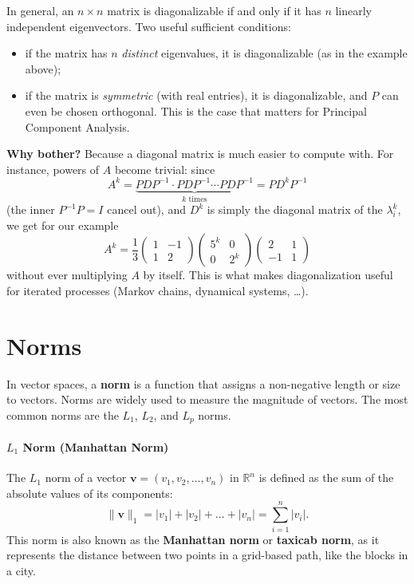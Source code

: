\documentclass[]{article}
\begin{document}
	In general, an $n \times n$ matrix is diagonalizable if and only if it has $n$ linearly independent eigenvectors.
	Two useful sufficient conditions:
	\begin{itemize}
		\item if the matrix has $n$ \textit{distinct} eigenvalues, it is diagonalizable (as in the example above);
		\item if the matrix is \textit{symmetric} (with real entries), it is diagonalizable, and $P$ can even be chosen orthogonal. This is the case that matters for Principal Component Analysis.
	\end{itemize}

	\noindent \textbf{Why bother?}
	Because a diagonal matrix is much easier to compute with.
	For instance, powers of $A$ become trivial: since
	$$
	A^k = \underbrace{PDP^{-1} \cdot PDP^{-1} \cdots PDP^{-1}}_{k \text{ times}} = P D^k P^{-1}
	$$
	(the inner $P^{-1}P = I$ cancel out), and $D^k$ is simply the diagonal matrix of the $\lambda_i^k$, we get for our example
	$$
	A^{k} = \frac{1}{3}\begin{pmatrix} 1 & -1 \\ 1 & 2 \end{pmatrix}\begin{pmatrix} 5^{k} & 0 \\ 0 & 2^{k} \end{pmatrix}\begin{pmatrix} 2 & 1 \\ -1 & 1 \end{pmatrix}
	$$
	without ever multiplying $A$ by itself.
	This is what makes diagonalization useful for iterated processes (Markov chains, dynamical systems, \dots).
	
	
	\section{Norms}
	In vector spaces, a \textbf{norm} is a function that assigns a non-negative length or size to vectors.
	Norms are widely used to measure the magnitude of vectors.
	The most common norms are the $L_1$, $L_2$, and $L_p$ norms.
	
	\paragraph{$L_1$ Norm (Manhattan Norm)}
	The $L_1$ norm of a vector $\mathbf{v} = (v_1, v_2, \dots, v_n)$ in $\mathbb{R}^n$ is defined as the sum of the absolute values of its components:
	$$
	\|\mathbf{v}\|_1 = |v_1| + |v_2| + \dots + |v_n| = \sum_{i=1}^{n} |v_i|.
	$$
	This norm is also known as the \textbf{Manhattan norm} or \textbf{taxicab norm}, as it represents the distance between two points in a grid-based path, like the blocks in a city.
	
\end{document}
